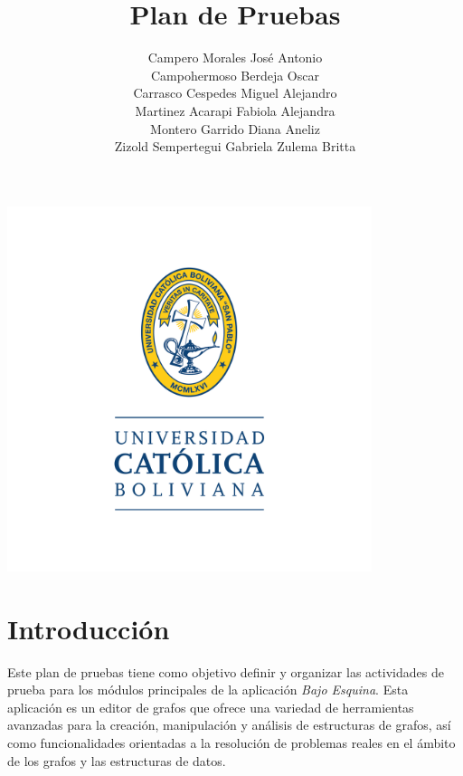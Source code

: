 \documentclass[stu, 12pt, letterpaper, donotrepeattitle, floatsintext, natbib]{apa7}
\title{\Large Plan de Pruebas}
\author{
    Campero Morales José Antonio \\
    Campohermoso Berdeja Oscar \\
    Carrasco Cespedes Miguel Alejandro \\
    Martinez Acarapi Fabiola Alejandra \\
    Montero Garrido Diana Aneliz \\
    Zizold Sempertegui Gabriela Zulema Britta
}
\affiliation{Universidad Católica Boliviana}
\begin{document}
\thispagestyle{empty}

\centering
\includegraphics[width=0.8\textwidth]{../imgs/logo-ucb.png} %
\vspace{-5cm} %

\maketitle

\newpage
{}
\renewcommand\contentsname{\large Índice}
\tableofcontents
\setcounter{tocdepth}{2}
\newpage
\renewcommand{\listfigurename}{\large Índice de figuras}
\listoffigures
\newpage
\renewcommand{\listtablename}{\large Índice de tablas}
\listoftables
\newpage

\section{\large Introducci\'on}

\noindent Este plan de pruebas tiene como objetivo definir y organizar las actividades de prueba para los m\'odulos principales de la aplicaci\'on \textit{Bajo Esquina}. Esta aplicaci\'on es un editor de grafos que ofrece una variedad de herramientas avanzadas para la creaci\'on, manipulaci\'on y an\'alisis de estructuras de grafos, as\'i como funcionalidades orientadas a la resoluci\'on de problemas reales en el \'ambito de los grafos y las estructuras de datos.
\end{document}
